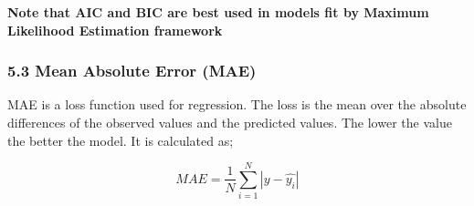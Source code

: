 \documentclass[
]{article}
\begin{document}
\textbf{Note that AIC and BIC are best used in models fit by Maximum
Likelihood Estimation framework}

\hypertarget{mean-absolute-error-mae}{%
\subsubsection{5.3 Mean Absolute Error
(MAE)}\label{mean-absolute-error-mae}}

MAE is a loss function used for regression. The loss is the mean over
the absolute differences of the observed values and the predicted
values. The lower the value the better the model. It is calculated as;

\[MAE=\frac{1}{N}\sum_{i=1}^N|y-\hat{y_i}|\]
\end{document}
